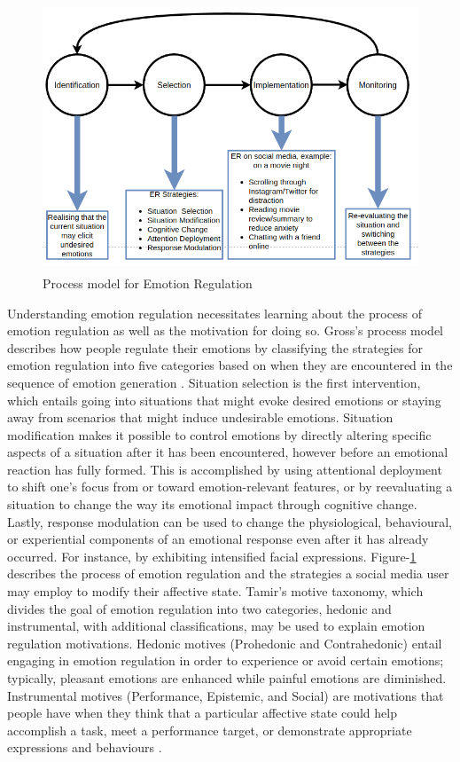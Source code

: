 \documentclass[lettersize,journal]{IEEEtran}
\begin{document}
\begin{figure}[h]
  
    \centering
    \includegraphics[width=14cm,height=8cm,keepaspectratio]{up_model.png}
  \caption{Process model for Emotion Regulation}
  \label{fig:Process}
  \end{figure}
Understanding emotion regulation necessitates learning about the process of emotion regulation as well as the motivation for doing so. Gross's process model describes how people regulate their emotions by classifying the strategies for emotion regulation into five categories based on when they are encountered in the sequence of emotion generation \cite{wadley2020digital}. Situation selection is the first intervention, which entails going into situations that might evoke desired emotions or staying away from scenarios that might induce undesirable emotions. Situation modification makes it possible to control emotions by directly altering specific aspects of a situation after it has been encountered, however before an emotional reaction has fully formed. This is accomplished by using attentional deployment to shift one's focus from or toward emotion-relevant features, or by reevaluating a situation to change the way its emotional impact through cognitive change. Lastly, response modulation can be used to change the physiological, behavioural, or experiential components of an emotional response even after it has already occurred. For instance, by exhibiting intensified facial expressions. Figure-\ref{fig:Process} describes the process of emotion regulation and the strategies a social media user may employ to modify their affective state. Tamir's motive taxonomy, which divides the goal of emotion regulation into two categories, hedonic and instrumental, with additional classifications, may be used to explain emotion regulation motivations. Hedonic motives (Prohedonic and Contrahedonic) entail engaging in emotion regulation in order to experience or avoid certain emotions; typically, pleasant emotions are enhanced while painful emotions are diminished. Instrumental motives (Performance, Epistemic, and Social) are motivations that people have when they think that a particular affective state could help accomplish a task, meet a performance target, or demonstrate appropriate expressions and behaviours \cite{wadley2020digital}.
\end{document}
